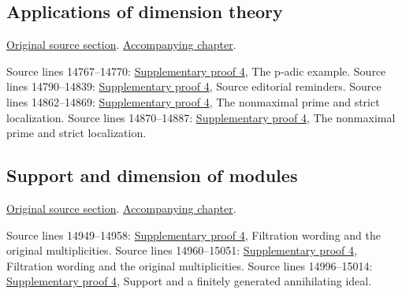 \subsection{Applications of dimension theory}
\hypertarget{algebra-source-section-applications-dimension-theory}{}
\noindent\href{https://github.com/stacks/stacks-project/blob/a04446e57ec1fbc252a871afcec7752fb2807b14/algebra.tex\#L14731}{Original source section}. \href{algebra.pdf\#nameddest=section-applications-dimension-theory}{Accompanying chapter}.

\begin{AlgebraSourceRoutes}
 Source lines 14767--14770: \hyperlink{algebra_dimension_support_associated_notes_20260927}{Supplementary proof 4}, The p-adic example.
 Source lines 14790--14839: \hyperlink{algebra_dimension_support_associated_notes_20260927}{Supplementary proof 4}, Source editorial reminders.
 Source lines 14862--14869: \hyperlink{algebra_dimension_support_associated_notes_20260927}{Supplementary proof 4}, The nonmaximal prime and strict localization.
 Source lines 14870--14887: \hyperlink{algebra_dimension_support_associated_notes_20260927}{Supplementary proof 4}, The nonmaximal prime and strict localization.
\end{AlgebraSourceRoutes}

\subsection{Support and dimension of modules}
\hypertarget{algebra-source-section-support}{}
\noindent\href{https://github.com/stacks/stacks-project/blob/a04446e57ec1fbc252a871afcec7752fb2807b14/algebra.tex\#L14909}{Original source section}. \href{algebra.pdf\#nameddest=section-support}{Accompanying chapter}.

\begin{AlgebraSourceRoutes}
 Source lines 14949--14958: \hyperlink{algebra_dimension_support_associated_notes_20260927}{Supplementary proof 4}, Filtration wording and the original multiplicities.
 Source lines 14960--15051: \hyperlink{algebra_dimension_support_associated_notes_20260927}{Supplementary proof 4}, Filtration wording and the original multiplicities.
 Source lines 14996--15014: \hyperlink{algebra_dimension_support_associated_notes_20260927}{Supplementary proof 4}, Support and a finitely generated annihilating ideal.
\end{AlgebraSourceRoutes}

